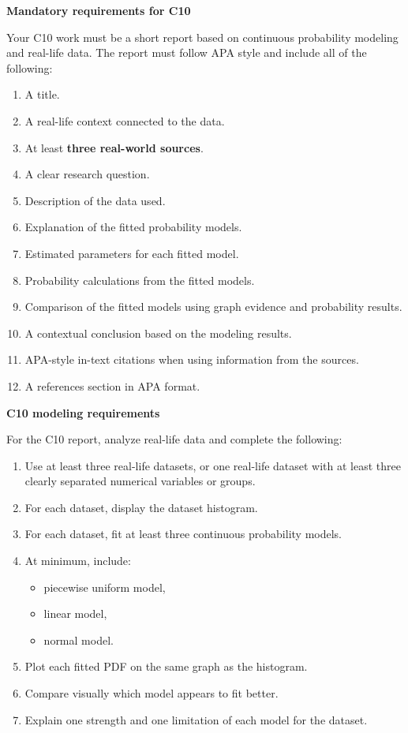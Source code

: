 \documentclass[12pt]{article}
\newcommand{\SubsectionBox}[1]{%
	\noindent\colorbox{gray!30}{%
		\parbox{\linewidth}{\textbf{#1}}%
	}\par\vspace{0.35cm}%
}
\begin{document}
	\SubsectionBox{Mandatory requirements for C10}
	Your C10 work must be a short report based on continuous probability modeling and real-life data. The report must follow APA style and include all of the following:
	\begin{enumerate}
		\item A title.
		\item A real-life context connected to the data.
		\item At least \textbf{three real-world sources}.
		\item A clear research question.
		\item Description of the data used.
		\item Explanation of the fitted probability models.
		\item Estimated parameters for each fitted model.
		\item Probability calculations from the fitted models.
		\item Comparison of the fitted models using graph evidence and probability results.
		\item A contextual conclusion based on the modeling results.
		\item APA-style in-text citations when using information from the sources.
		\item A references section in APA format.
	\end{enumerate}
	
	\SubsectionBox{C10 modeling requirements}
	For the C10 report, analyze real-life data and complete the following:
	\begin{enumerate}
		\item Use at least three real-life datasets, or one real-life dataset with at least three clearly separated numerical variables or groups.
		\item For each dataset, display the dataset histogram.
		\item For each dataset, fit at least three continuous probability models.
		\item At minimum, include:
		\begin{itemize}
			\item piecewise uniform model,
			\item linear model,
			\item normal model.
		\end{itemize}
		\item Plot each fitted PDF on the same graph as the histogram.
		\item Compare visually which model appears to fit better.
		\item Explain one strength and one limitation of each model for the dataset.
	\end{enumerate}
	
\end{document}
